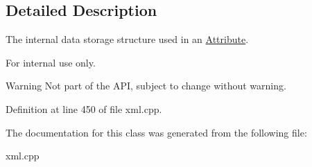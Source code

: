 \subsection{Detailed Description}
The internal data storage structure used in an \hyperlink{classphys_1_1xml_1_1Attribute}{Attribute}. \begin{DoxyInternal}{For internal use only.}
\begin{DoxyWarning}{Warning}
Not part of the API, subject to change without warning. 
\end{DoxyWarning}
\end{DoxyInternal}


Definition at line 450 of file xml.cpp.



The documentation for this class was generated from the following file:\begin{DoxyCompactItemize}
\item 
xml.cpp\end{DoxyCompactItemize}
